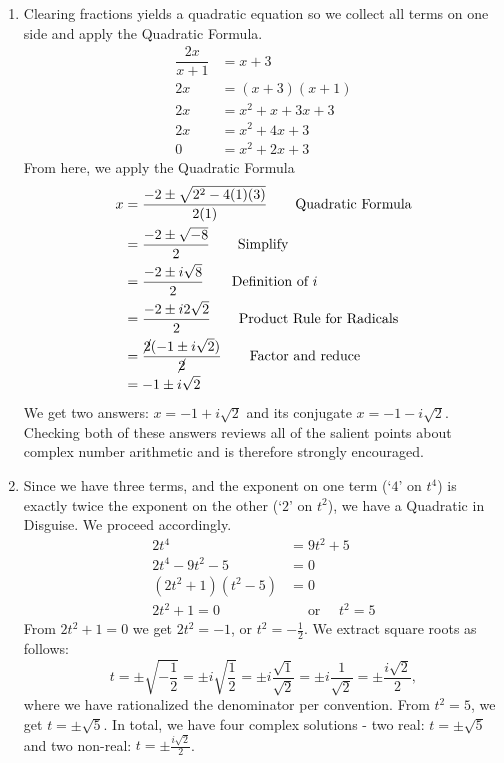 {
\begin{enumerate}


\item  Clearing fractions yields a quadratic equation so we collect all terms on one side and apply the Quadratic Formula.
\begin{align*}
\dfrac{2x}{x+1} & =   x+3  \\
2x & =  (x+3)(x+1)  \tag*{Clear denominators} \\
2x & =  x^2 + x + 3x + 3  \tag*{F.O.I.L.} \\
2x & =  x^2 + 4x + 3  \tag*{Gather like terms} \\
 0 & =  x^2 + 2x + 3  \tag*{Subtract $2x$}
\end{align*}
From here, we apply the Quadratic Formula 
\begin{align*}
x  & =   \dfrac{-2 \pm \sqrt{2^2 - 4(1)(3)}}{2(1)}   \tag*{Quadratic Formula}\\
    & =   \dfrac{-2 \pm \sqrt{-8}}{2}  \tag*{Simplify}\\
	& =   \dfrac{-2 \pm i \sqrt{8}}{2}  \tag*{Definition of $i$}\\
	& =   \dfrac{-2 \pm i 2\sqrt{2}}{2}  \tag*{Product Rule for Radicals}\\
	& =  \dfrac{\cancel{2}(-1 \pm i\sqrt{2})}{\cancel{2}} \tag*{Factor and reduce}\\
	& =  -1 \pm i \sqrt{2} 
\end{align*}		
We get two answers: $x = -1 + i\sqrt{2}$ and its conjugate $x = -1 - i\sqrt{2}$.  Checking both of these answers reviews all of the salient points about complex number arithmetic and is therefore strongly encouraged.

\item  Since we have three terms, and the exponent on one term (`$4$' on $t^4$) is exactly twice the exponent on the other (`$2$' on $t^2$), we have a Quadratic in Disguise.  We proceed accordingly.
\begin{align*}
2t^4 & =  9t^2 + 5  \\
2t^4 - 9t^2 - 5 & =  0  \tag*{Subtract $9t^2$ and $5$} \\
(2t^2 + 1)(t^2 - 5) & =  0  \tag*{Factor} \\
2t^2 + 1 = 0 & \quad \text{ or } \quad  t^2 = 5  \tag*{Zero Product Property}
\end{align*}
From $2t^2 + 1 = 0$ we get $2t^2 = -1$, or $t^2 = -\frac{1}{2}$.  We extract square roots as follows: 
\[ 
t = \pm \sqrt{-\dfrac{1}{2}} = \pm i \sqrt{\dfrac{1}{2}} = \pm i \dfrac{\sqrt{1}}{\sqrt{2}} = \pm i \dfrac{1}{\sqrt{2}} = \pm \dfrac{i \sqrt{2}}{2},
\]
where we have rationalized the denominator per convention.  From $t^2 = 5$, we get $t = \pm \sqrt{5}$. In total, we have four complex solutions - two real: $t = \pm \sqrt{5}$ and two non-real: $t = \pm \frac{i \sqrt{2}}{2}$.


\end{enumerate}}
